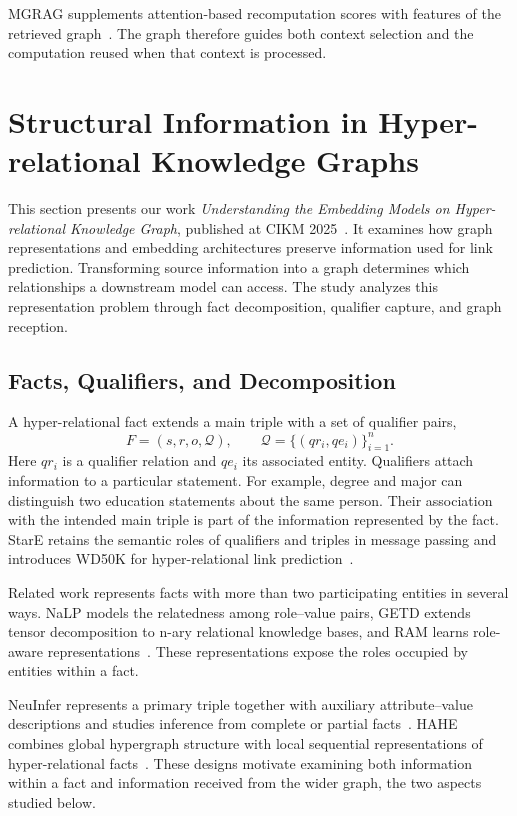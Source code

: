 MGRAG supplements attention-based recomputation scores with features of the retrieved graph~\cite{bg-mgrag}. The graph therefore guides both context selection and the computation reused when that context is processed.

\section{Structural Information in Hyper-relational Knowledge Graphs}
\label{sec:background:hyperkg}

This section presents our work \emph{Understanding the Embedding Models on Hyper-relational Knowledge Graph}, published at CIKM 2025~\cite{bg-hyperkg}. It examines how graph representations and embedding architectures preserve information used for link prediction. Transforming source information into a graph determines which relationships a downstream model can access. The study analyzes this representation problem through fact decomposition, qualifier capture, and graph reception.

\subsection{Facts, Qualifiers, and Decomposition}

A hyper-relational fact extends a main triple with a set of qualifier pairs,
\begin{equation}
F=\left(s,r,o,\mathcal{Q}\right),\qquad
\mathcal{Q}=\{(qr_i,qe_i)\}_{i=1}^{n}.
\label{eq:background:hyper-fact}
\end{equation}
Here $qr_i$ is a qualifier relation and $qe_i$ its associated entity. Qualifiers attach information to a particular statement. For example, degree and major can distinguish two education statements about the same person. Their association with the intended main triple is part of the information represented by the fact. StarE retains the semantic roles of qualifiers and triples in message passing and introduces WD50K for hyper-relational link prediction~\cite{bg-stare}.

Related work represents facts with more than two participating entities in several ways. NaLP models the relatedness among role--value pairs, GETD extends tensor decomposition to n-ary relational knowledge bases, and RAM learns role-aware representations~\cite{lit-guan2019link,lit-liu2020generalizing,lit-liu2021role}. These representations expose the roles occupied by entities within a fact.

NeuInfer represents a primary triple together with auxiliary attribute--value descriptions and studies inference from complete or partial facts~\cite{lit-guan2020neuinfer}. HAHE combines global hypergraph structure with local sequential representations of hyper-relational facts~\cite{lit-luo2023hahe}. These designs motivate examining both information within a fact and information received from the wider graph, the two aspects studied below.

